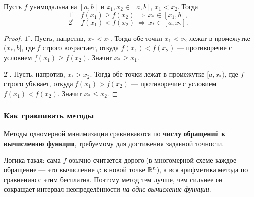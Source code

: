 \begin{lemma}\label{lem:unimodal}
Пусть $f$ унимодальна на $[a,b]$ и $x_1, x_2 \in [a,b]$, $x_1 < x_2$. Тогда
\[
  1^\circ\quad f(x_1) \ge f(x_2) \ \Longrightarrow\ x_* \in [x_1, b] ,
\]
\[
  2^\circ\quad f(x_1) < f(x_2) \ \Longrightarrow\ x_* \in [a, x_2] .
\]
\end{lemma}


\begin{proof}
$1^\circ$. Пусть, напротив, $x_* < x_1$. Тогда обе точки $x_1 < x_2$ лежат в
промежутке $(x_*, b]$, где $f$ строго возрастает, откуда $f(x_1) < f(x_2)$ —
противоречие с условием $f(x_1) \ge f(x_2)$. Значит $x_* \ge x_1$.

\medskip
$2^\circ$. Пусть, напротив, $x_* > x_2$. Тогда обе точки лежат в промежутке
$[a, x_*)$, где $f$ строго убывает, откуда $f(x_1) > f(x_2)$ — противоречие с
условием $f(x_1) < f(x_2)$. Значит $x_* \le x_2$.
\end{proof}

\subsubsection*{Как сравнивать методы}

\begin{idea}[title={Критерий сравнения}]
Методы одномерной минимизации сравниваются по \textbf{числу обращений к
вычислению функции}, требуемому для достижения заданной точности.

\medskip
Логика такая: сама $f$ обычно считается дорого (в многомерной схеме каждое
обращение — это вычисление $\varphi$ в новой точке $\mathbb{R}^n$), а вся арифметика
метода по сравнению с этим бесплатна. Поэтому метод тем лучше, чем сильнее он
сокращает интервал неопределённости \emph{на одно вычисление функции}.
\end{idea}
